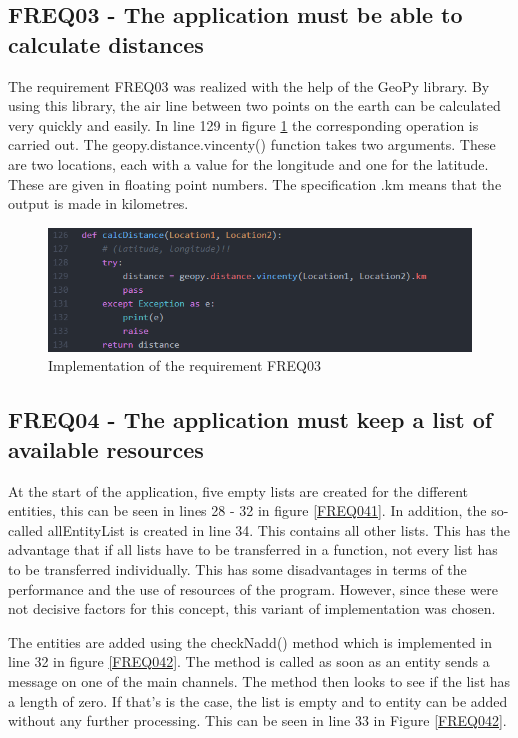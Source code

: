 \subsection{FREQ03 - The application must be able to calculate distances}
The requirement FREQ03 was realized with the help of the GeoPy library. By using this library, the air line between two points on the earth can be calculated very quickly and easily. In line 129 in figure \ref{FREQ03} the corresponding operation is carried out. The geopy.distance.vincenty() function takes two arguments. These are two locations, each with a value for the longitude and one for the latitude. These are given in floating point numbers. The specification .km means that the output is made in kilometres.

\begin{figure}
\sidecaption
\includegraphics[scale=0.4]{images/walter/code/FREQ02-00.png}
\caption{Implementation of the requirement FREQ03}
\label{FREQ03}
\end{figure}

\subsection{FREQ04 - The application must keep a list of available resources}

At the start of the application, five empty lists are created for the different entities, this can be seen in lines 28 - 32 in figure \ref{FREQ041}. In addition, the so-called allEntityList is created in line 34. This contains all other lists. This has the advantage that if all lists have to be transferred in a function, not every list has to be transferred individually. This has some disadvantages in terms of the performance and the use of resources of the program. However, since these were not decisive factors for this concept, this variant of implementation was chosen. 

The entities are added using the checkNadd() method which is implemented in line 32 in figure \ref{FREQ042}. The method is called as soon as an entity sends a message on one of the main channels. The method then looks to see if the list has a length of zero. If that's is the case, the list is empty and to entity can be added without any further processing. This can be seen in line 33 in Figure \ref{FREQ042}. 

